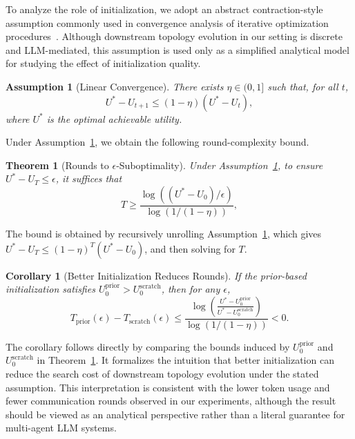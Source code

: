 \documentclass[lettersize,journal]{IEEEtran}
\theoremstyle{plain}
\newtheorem{theorem}{Theorem}
\newtheorem{corollary}{Corollary}
\newtheorem{assumption}{Assumption}
\begin{document}
To analyze the role of initialization, we adopt an abstract contraction-style assumption commonly used in convergence analysis of iterative optimization procedures~\cite{DBLP:books/sp/Nesterov04}. Although downstream topology evolution in our setting is discrete and LLM-mediated, this assumption is used only as a simplified analytical model for studying the effect of initialization quality.

\begin{assumption}[Linear Convergence]
\label{asm:contraction}
There exists $\eta\in(0,1]$ such that, for all $t$,
\begin{equation}
U^*-U_{t+1}\leq(1-\eta)(U^*-U_t),
\end{equation}
where $U^*$ is the optimal achievable utility.
\end{assumption}

Under Assumption~\ref{asm:contraction}, we obtain the following round-complexity bound.

\begin{theorem}[Rounds to $\epsilon$-Suboptimality]
\label{thm:rounds}
Under Assumption~\ref{asm:contraction}, to ensure $U^*-U_T\leq\epsilon$,
it suffices that
\begin{equation}
T\geq
\frac{\log((U^*-U_0)/\epsilon)}{\log(1/(1-\eta))},
\end{equation}
\end{theorem}

The bound is obtained by recursively unrolling Assumption~\ref{asm:contraction}, which gives $U^*-U_T\leq(1-\eta)^T(U^*-U_0)$, and then solving for $T$.

\begin{corollary}[Better Initialization Reduces Rounds]
\label{cor:rounds_reduction}
If the prior-based initialization satisfies $U_0^{\mathrm{prior}}>U_0^{\mathrm{scratch}}$, then for any $\epsilon$,
\begin{equation}
T_{\mathrm{prior}}(\epsilon)-T_{\mathrm{scratch}}(\epsilon)
\leq
\frac{
\log\!\left(
\frac{U^*-U_0^{\mathrm{prior}}}{U^*-U_0^{\mathrm{scratch}}}
\right)
}{
\log(1/(1-\eta))
}
<0.
\end{equation}
\end{corollary}

The corollary follows directly by comparing the bounds induced by $U_0^{\mathrm{prior}}$ and $U_0^{\mathrm{scratch}}$ in Theorem~\ref{thm:rounds}. It formalizes the intuition that better initialization can reduce the search cost of downstream topology evolution under the stated assumption. This interpretation is consistent with the lower token usage and fewer communication rounds observed in our experiments, although the result should be viewed as an analytical perspective rather than a literal guarantee for multi-agent LLM systems.
\end{document}
